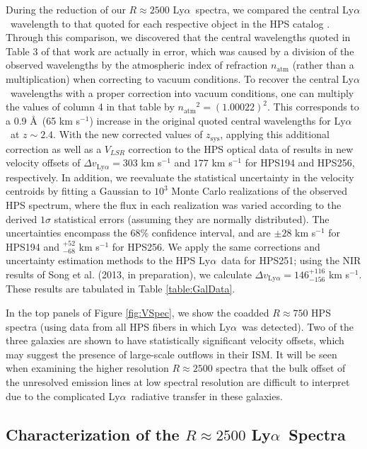 \documentclass{emulateapj}
\newcommand{\lya}{Ly$\alpha$}
\begin{document}
During the reduction of our $R\approx2500$ \lya\ spectra, we compared the central \lya\ wavelength to that quoted for each respective object in the HPS catalog \citep{adams2011}. Through this comparison, we discovered that the central wavelengths quoted in Table 3 of that work are actually in error, which was caused by a division of the observed wavelengths by the atmospheric index of refraction $n_{\mathrm{atm}}$ (rather than a multiplication) when correcting to vacuum conditions. To recover the central \lya\ wavelengths with a proper correction into vacuum conditions, one can multiply the values of column 4 in that table by $n_{\mathrm{atm}}$$^{2} = (1.00022)^{2}$. This corresponds to a 0.9 \AA\ (65 km s$^{-1}$) increase in the original quoted central wavelengths for \lya\ at $z \sim 2.4$. With the new corrected values of $z_{\mathrm{sys}}$, applying this additional correction as well as a $V_{LSR}$ correction to the HPS optical data of \citet{adams2011} results in new velocity offsets of $\Delta v_{\mathrm{Ly}\alpha} = 303$ km s$^{-1}$ and $177$ km s$^{-1}$ for HPS194 and HPS256, respectively. In addition, we reevaluate the statistical uncertainty in the velocity centroids by fitting a Gaussian to $10^{3}$ Monte Carlo realizations of the observed HPS spectrum, where the flux in each realization was varied according to the derived $1\sigma$ statistical errors (assuming they are normally distributed). The uncertainties encompass the 68\% confidence interval, and are $\pm28$ km s$^{-1}$ for HPS194 and $^{+52}_{-68}$ km s$^{-1}$ for HPS256. We apply the same corrections and uncertainty estimation methods to the HPS \lya\ data for HPS251; using the NIR results of Song et al. (2013, in preparation), we calculate $\Delta v_{\mathrm{Ly}\alpha} = 146^{+116}_{-156}$ km s$^{-1}$. These results are tabulated in Table \ref{table:GalData}.

In the top panels of Figure \ref{fig:VSpec}, we show the coadded $R\approx750$ HPS spectra (using data from all HPS fibers in which \lya\ was detected). Two of the three galaxies are shown to have statistically significant velocity offsets, which may suggest the presence of large-scale outflows in their ISM. It will be seen when examining the higher resolution $R\approx2500$ spectra that the bulk offset of the unresolved emission lines at low spectral resolution are difficult to interpret due to the complicated \lya\ radiative transfer in these galaxies.

\subsection{Characterization of the $R \approx 2500$ \lya\ Spectra}\label{subsec:LyAFitting}
\end{document}
